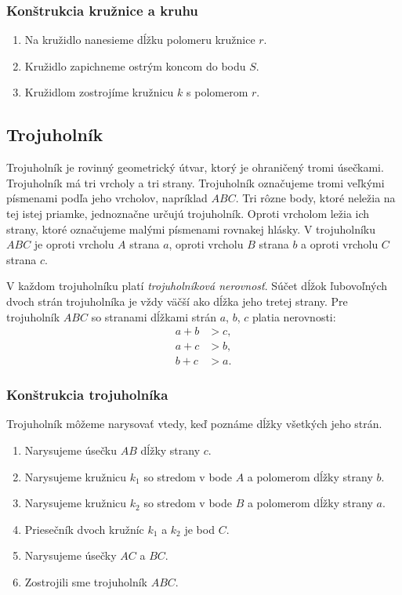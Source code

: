 \documentclass{article}
\begin{document}
\subsubsection{Konštrukcia kružnice a kruhu}

\begin{enumerate}[label=\arabic*)]
  \item Na kružidlo nanesieme dĺžku polomeru kružnice \(r\).
  \item Kružidlo zapichneme ostrým koncom do bodu \(S\).
  \item Kružidlom zostrojíme kružnicu \(k\) s polomerom \(r\).
\end{enumerate}

\subsection{Trojuholník}

Trojuholník je rovinný geometrický útvar, ktorý je ohraničený tromi úsečkami. Trojuholník má tri vrcholy a tri strany. Trojuholník označujeme tromi veľkými písmenami podľa jeho vrcholov, napríklad \(ABC\). Tri rôzne body, ktoré neležia na tej istej priamke, jednoznačne určujú trojuholník. Oproti vrcholom ležia ich strany, ktoré označujeme malými písmenami rovnakej hlásky. V trojuholníku \(ABC\) je oproti vrcholu \(A\) strana \(a\), oproti vrcholu \(B\) strana \(b\) a oproti vrcholu \(C\) strana \(c\).

V každom trojuholníku platí \emph{trojuholníková nerovnosť}. Súčet dĺžok ľubovoľných dvoch strán trojuholníka je vždy väčší ako dĺžka jeho tretej strany. Pre trojuholník \(ABC\) so stranami dĺžkami strán \(a\), \(b\), \(c\) platia nerovnosti:
\[
\begin{aligned}
  a + b &> c, \\
  a + c &> b, \\
  b + c &> a.
\end{aligned}
\]

\subsubsection{Konštrukcia trojuholníka}

Trojuholník môžeme narysovať vtedy, keď poznáme dĺžky všetkých jeho strán.

\begin{enumerate}[label=\arabic*)]
  \item Narysujeme úsečku \(AB\) dĺžky strany \(c\).
  \item Narysujeme kružnicu \(k_1\) so stredom v bode \(A\) a polomerom dĺžky strany \(b\).
  \item Narysujeme kružnicu \(k_2\) so stredom v bode \(B\) a polomerom dĺžky strany \(a\).
  \item Priesečník dvoch kružníc \(k_1\) a \(k_2\) je bod \(C\).
  \item Narysujeme úsečky \(AC\) a \(BC\).
  \item Zostrojili sme trojuholník \(ABC\).
\end{enumerate}
\end{document}
